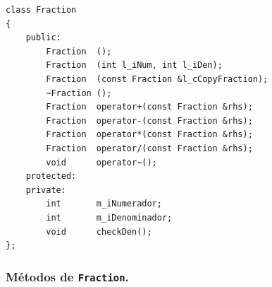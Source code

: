 \begin{verbatim}
class Fraction
{
	public:
		Fraction  ();
		Fraction  (int l_iNum, int l_iDen);
		Fraction  (const Fraction &l_cCopyFraction);
		~Fraction ();
		Fraction  operator+(const Fraction &rhs);
		Fraction  operator-(const Fraction &rhs);
		Fraction  operator*(const Fraction &rhs);
		Fraction  operator/(const Fraction &rhs);
		void      operator~();
	protected:
	private:
		int       m_iNumerador;
		int       m_iDenominador;
		void      checkDen();
};
\end{verbatim}


\subsubsection{Métodos de \texttt{Fraction}.}
